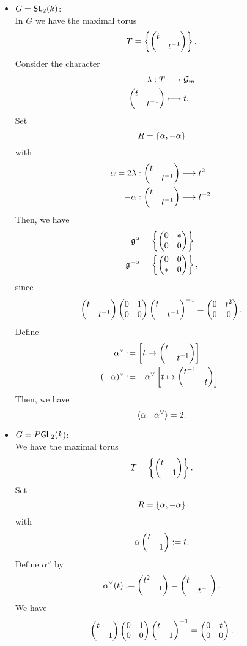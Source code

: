 \begin{example}
	\begin{itemize}
		\item $G = \SL_2(k)$:\\
		In $G$ we have the maximal torus
		\[ T= \curv{\mat{t & \\ & t\i}}. \]
		Consider the character
		\begin{align*}
		\lambda : T & \Pfeil{} \G_m\\
		\mat{t & \\ & t\i} & \longmapsto t.
		\end{align*}
		Set
		\[ R = \curv{\alpha, - \alpha} \]
		with
		\begin{align*}
		\alpha = 2\lambda : \mat{t & \\ & t\i} & \longmapsto t^2\\
		-\alpha : \mat{t & \\ & t\i} & \longmapsto t^{-2}.
		\end{align*}
		Then, we have
		\begin{align*}
		\mathfrak{g}^\alpha &= \curv{\mat{0 & * \\ 0 & 0}}\\
		\mathfrak{g}^{-\alpha} &= \curv{\mat{0 & 0 \\ * & 0}},
		\end{align*}
		since
		\[ 
		\mat{t & \\ & t\i} \mat{0 & 1 \\ 0 & 0} \mat{t & \\ & t\i}\i = \mat{0 & t^2 \\ 0 & 0}.
		 \]
		 Define
		 \begin{align*}
		 \alpha^\vee &:= \brak{
	t\mapsto \mat{t & \\ & t\i}	 
	 }\\
 (-\alpha)^\vee &:= - \alpha^\vee \brak{
 	t\mapsto \mat{t\i & \\ & t}	 
 }.
		 \end{align*}
		 Then, we have
		 \[ \skp{\alpha}{ \alpha^\vee} = 2. \]
		\item $G = P \GL_2(k)$:\\
		We have the maximal torus
		\[ T = \curv{\mat{t & \\ & 1}}. \]
		Set
		\[ R = \curv{\alpha, -\alpha} \]
		with
		\[ \alpha\mat{t & \\ & 1} := t. \]
		Define $\alpha^\vee$ by
		\[ \alpha^\vee(t) := \mat{t^2 & \\ & ^1} = \mat{t & \\ & t\i}. \]
		We have
		\[ \mat{t & \\ & 1} \mat{0 & 1\\ 0 & 0} \mat{t & \\ & 1}\i = \mat{0 & t \\ 0 & 0}. \]
	\end{itemize}
\end{example}
